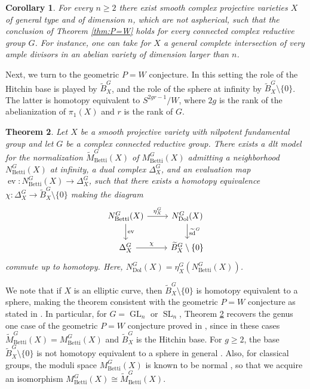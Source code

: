 \documentclass[11pt, a4paper]{amsart}
\newtheorem{theorem}{Theorem}[section]
\newtheorem{corollary}[theorem]{Corollary}
\theoremstyle{definition}
\theoremstyle{myitemstyle}
\DeclareMathOperator{\GL}{GL}
\DeclareMathOperator{\SL}{SL}
\DeclareMathOperator{\ev}{ev}
\newcommand{\Dol}{{\mathrm{Dol}}}
\newcommand{\Betti}{{\mathrm{Betti}}}
\newcommand{\sd}{{\operatorname{sd}}}
\begin{document}
\begin{corollary}
	\label{cor:intro general type}
	For every $n\geq2$ there exist smooth complex projective varieties $X$ of general type and of dimension $n$, which are not aspherical, such that the conclusion of Theorem \ref{thm:P=W} holds for every connected complex reductive group $G$. For instance, one can take for $X$ a general complete intersection of very ample divisors in an abelian variety of dimension larger than $n$.
\end{corollary}

Next, we  turn to the geometric $P=W$ conjecture. In this setting the role of the Hitchin base is played by $\widetilde{B}^G_X$, and the role of the sphere at infinity by $\widetilde{B}^G_X\setminus\{0\}$. The latter  is homotopy equivalent to $S^{2gr-1}/W$, where $2g$ is the rank of the abelianization of $\pi_1(X)$ and $r$ is the rank of $G$. 

\begin{theorem}
\label{thm:geometric P=W}
Let $X$ be a smooth projective variety with nilpotent fundamental group and let $G$ be a complex connected reductive group. 
There exists a dlt model  for the normalization $\widetilde M^G_\Betti(X)$ of $M^G_\Betti(X)$ admitting a neighborhood  $N^G_\Betti(X)$ at infinity, a  dual complex $\Delta^G_X$, and an evaluation map $\ev\colon N^G_\Betti(X)\to \Delta^G_X$, such that there exists a homotopy equivalence $\chi\colon \Delta_X^G \to \widetilde B^G_X\setminus \{0\}$ making the diagram
\[
\begin{tikzcd}
    N^G_\Betti(X) 
    \arrow[r,"\eta_X^G"]
    \arrow[d,"\ev"]&
        N^G_\Dol(X)
        \arrow[d,"\widetilde\sd^G"]\\
    \Delta^G_X
    \arrow[r,"\chi"]&
        \widetilde B^G_X\setminus\{0\}
\end{tikzcd}
\]
commute up to homotopy. Here, $N^G_\Dol(X)=\eta_X^G(N^G_\Betti(X))$.
\end{theorem}

We note that if $X$ is an elliptic curve, then $\widetilde B^G_X\setminus \{0\}$ is homotopy equivalent to a sphere, making the theorem consistent with the geometric $P=W$ conjecture as stated in \cite{KNPS15}. In particular, for $G=\GL_n$ or $\SL_n$, Theorem \ref{thm:geometric P=W} recovers the genus one case of the geometric $P=W$ conjecture proved in \cite{MMS_geometricP=W}, since in these cases $\widetilde M^G_\Betti(X)=M^G_\Betti(X)$ and $\widetilde B^G_X$ is the Hitchin base. For $g\geq 2$, the base $\widetilde B^G_X\setminus \{0\}$ is not homotopy equivalent to a sphere in general \cite{BKU23}.
Also, for classical groups, the moduli space $M_{\Betti}^G(X)$ is known to be normal \cite[Theorem~2.1(3)]{Sikora}, so that we acquire an isomorphism $M_{\Betti}^G(X)\cong \widetilde M_{\Betti}^G(X)$.
 
\end{document}
